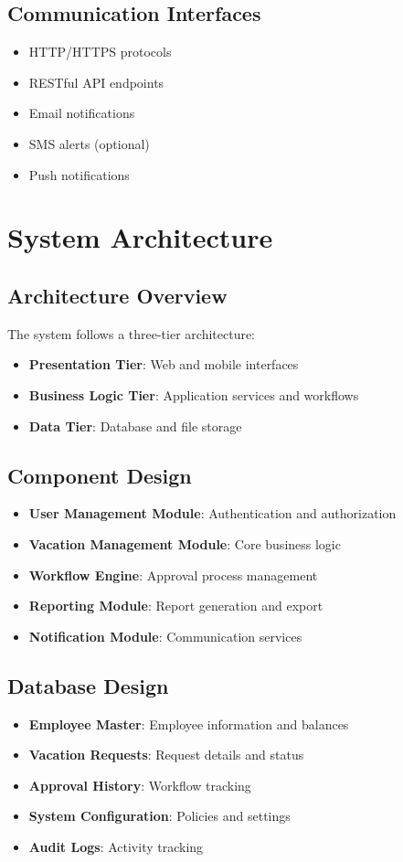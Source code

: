 \documentclass[12pt,a4paper]{article}
\begin{document}
\subsection{Communication Interfaces}
\begin{itemize}
    \item HTTP/HTTPS protocols
    \item RESTful API endpoints
    \item Email notifications
    \item SMS alerts (optional)
    \item Push notifications
\end{itemize}

\section{System Architecture}

\subsection{Architecture Overview}
The system follows a three-tier architecture:
\begin{itemize}
    \item \textbf{Presentation Tier}: Web and mobile interfaces
    \item \textbf{Business Logic Tier}: Application services and workflows
    \item \textbf{Data Tier}: Database and file storage
\end{itemize}

\subsection{Component Design}
\begin{itemize}
    \item \textbf{User Management Module}: Authentication and authorization
    \item \textbf{Vacation Management Module}: Core business logic
    \item \textbf{Workflow Engine}: Approval process management
    \item \textbf{Reporting Module}: Report generation and export
    \item \textbf{Notification Module}: Communication services
\end{itemize}

\subsection{Database Design}
\begin{itemize}
    \item \textbf{Employee Master}: Employee information and balances
    \item \textbf{Vacation Requests}: Request details and status
    \item \textbf{Approval History}: Workflow tracking
    \item \textbf{System Configuration}: Policies and settings
    \item \textbf{Audit Logs}: Activity tracking
\end{itemize}
\end{document}
